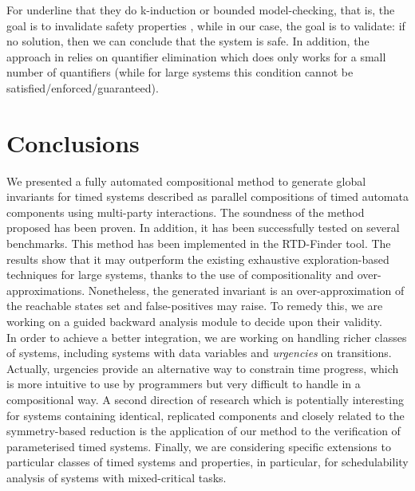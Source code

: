 \documentclass{LMCS}
\theoremstyle{plain}\newtheorem{remark}[thm]{Remark}
\theoremstyle{plain}\newtheorem{example}[thm]{Example}
\begin{document}
\begin{enumerate}
{For \cite{tiwari11:hybrid} underline that they do k-induction or
bounded model-checking, that is, the goal is to invalidate safety
properties , while in our case, the goal is to
validate: if no solution, then we can conclude that the system is
safe. In addition, the approach in \cite{tiwari11:hybrid} relies on
quantifier elimination which does only works for a small number of
quantifiers (while for large systems this condition cannot be
satisfied/enforced/guaranteed).

\cite{tiwari05:inv-hybrid}

\cite{pettersson07:partial}
}


\section{Conclusions}
\label{sec:conc}
We presented a fully automated compositional method to generate global
invariants for timed systems described as parallel compositions of
timed automata components using multi-party interactions. The
soundness of the method proposed has been proven. In addition, it has
been successfully tested on several benchmarks.
This method has been implemented in the RTD-Finder tool. The results
show that it may outperform the existing exhaustive
exploration-based techniques for large systems, thanks to the use of
compositionality and over-approximations.
Nonetheless, the generated invariant is an over-approximation of the 
reachable states set and false-positives may raise. To remedy this, 
we are working on a guided backward analysis module to decide upon 
their validity. \\
 In order to achieve a better integration, we are working on handling 
 richer classes of systems, including systems with data variables 
 and {\it urgencies} \cite{BozgaSifakis06} on transitions.
 Actually, urgencies provide an alternative way to constrain time progress, which is more intuitive to
use by programmers but very difficult to handle in a compositional
way. A second direction of research which is potentially interesting
for systems containing identical, replicated components and closely
related to the symmetry-based reduction is the application of our
method to the verification of parameterised timed systems. Finally, we
are considering specific extensions to particular classes of timed
systems and properties, in particular, for schedulability analysis of
systems with mixed-critical tasks.



\end{enumerate}
\end{document}
